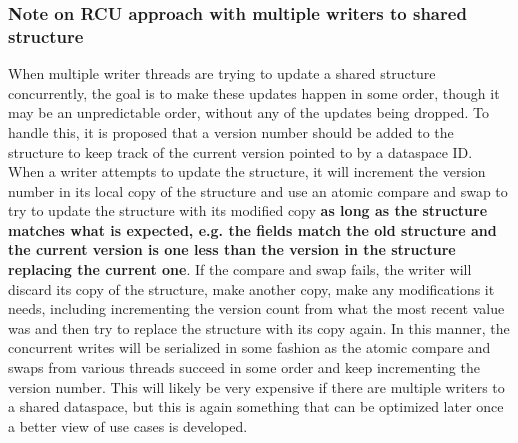 \documentclass[../HDF5_RFC.tex]{subfiles}
\begin{document}
\subsubsection{Note on RCU approach with multiple writers to shared structure}
\label{h5s_concurrency_serializing_writes}

When multiple writer threads are trying to update a shared  structure
concurrently, the goal is to make these updates happen in some order, though it may be an unpredictable
order, without any of the updates being dropped. To handle this, it is proposed that a version number
should be added to the  structure to keep track of the current version
pointed to by a dataspace ID. When a writer attempts to update the structure, it will increment the
version number in its local copy of the structure and use an atomic compare and swap to try to update
the structure with its modified copy \textbf{as long as the structure matches what is expected, e.g.
the fields match the old structure and the current version is one less than the version in the structure
replacing the current one}. If the compare and swap fails, the writer will discard its copy of the
structure, make another copy, make any modifications it needs, including incrementing the version count
from what the most recent value was and then try to replace the structure with its copy again. In this
manner, the concurrent writes will be serialized in some fashion as the atomic compare and swaps from
various threads succeed in some order and keep incrementing the version number. This will likely be
very expensive if there are multiple writers to a shared dataspace, but this is again something that
can be optimized later once a better view of use cases is developed.
\end{document}
